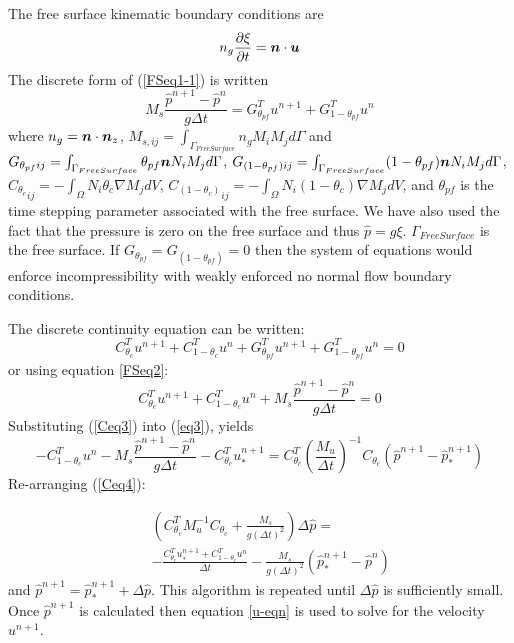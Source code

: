 \noindent The free surface kinematic boundary conditions are
\begin{equation}
 n_g\frac{\partial \xi}{\partial t} = {\mbox{\boldmath$n$}} \cdot {\mbox{\boldmath$u$}}
\label{FSeq1-1}
\end{equation}
\noindent The discrete form of (\ref{FSeq1-1}) is written
\begin{equation}
 M_s\frac{{\hat p}^{n+1}-{\hat p}^n}{g \Delta t} = 
G_{{\theta_{pf}}}^T u^{n+1}  +G_{{1-\theta_{pf}}}^T u^{n} 
\label{FSeq2}
\end{equation}
where $n_g={\mbox{\boldmath$n$}}\cdot {\mbox{\boldmath$n$}}_z$,  
$M_{s,ij}=\int_{\Gamma_{Free Surface}}n_gM_iM_j d \Gamma$ 
 and $G_{\theta_{pf} ij}=\int_{\Gamma_{Free Surface}}\theta_{pf} {\mbox{\boldmath$n$}}  N_iM_j d \Gamma $, 
 $G_{(1-\theta_{pf}) ij}=\int_{\Gamma_{Free Surface}}(1-\theta_{pf}) {\mbox{\boldmath$n$}}  N_iM_j d \Gamma $, 
 ${C_{\theta_c}}_{ij}=-\int_\Omega N_i \theta_c \nabla M_j d V$, 
 ${C_{(1-\theta_c)}}_{ij}=-\int_\Omega N_i (1-\theta_c) \nabla M_j d V$, 
 and $\theta_{pf}$ is the time stepping parameter associated with the free surface. We have 
 also used the fact that the pressure is zero on the free surface 
 and thus ${\hat p}=g\xi$. 
$\Gamma_{Free Surface}$ is the free surface. 
If $G_{\theta_{pf}}=G_{(1-\theta_{pf})}=0$ then the system 
of equations would enforce incompressibility with weakly enforced no normal flow 
boundary conditions. 

\noindent  
The discrete continuity equation can be written: 
\begin{equation}
C_{\theta_c}^T u^{n+1}+C_{1-\theta_c}^T u^{n}
 +G_{{\theta_{pf}}}^T u^{n+1}  +G_{{1-\theta_{pf}}}^T u^{n} =0
\label{Ceq2}
\end{equation}
or using equation \ref{FSeq2}: 
\begin{equation}
C_{\theta_c}^T u^{n+1}+C_{1-\theta_c}^T u^{n}
+M_s\frac{{\hat p}^{n+1}-{\hat p}^n}{g \Delta t}=0
\label{Ceq3}
\end{equation}
Substituting (\ref{Ceq3}) into (\ref{eq3}), yields       
\begin{equation}
-C_{1-\theta_c}^T u^{n}
-M_s\frac{{\hat p}^{n+1}-{\hat p}^n}{g \Delta t}-C_{\theta_c}^T u_*^{n+1}
=
C_{\theta_c}^T \left(\frac{M_u}{\Delta t}\right)^{-1}C_{\theta_c} 
({\hat p}^{n+1}-{\hat p}_*^{n+1})
\label{Ceq4}
\end{equation}
Re-arranging (\ref{Ceq4}): 

\begin{eqnarray}
&&\left(C_{\theta_c}^T 
M_u^{-1}C_{\theta_c}  
+ \frac{M_s}{g (\Delta t)^2}\right) \Delta {\hat p} =  \nonumber\\ 
&& -\frac{
C_{\theta_c}^T u^{n+1}_*+C_{1-\theta_c}^T u^{n}
}{\Delta t}
-\frac{M_s}{g (\Delta t)^2}({\hat p}_*^{n+1}-{\hat p}^{n})
\label{Ceq5}
\end{eqnarray}
and ${\hat p}^{n+1}={\hat p}_*^{n+1}+\Delta {\hat p}$. This algorithm 
is repeated until $\Delta {\hat p}$ is sufficiently small. 
Once ${\hat p}^{n+1}$ is calculated then equation \ref{u-eqn} 
is used to solve for the velocity $u^{n+1}$.






